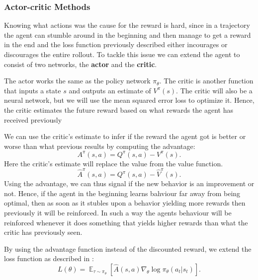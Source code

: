 \documentclass[12pt,A4]{report}
\theoremstyle{definition}
\begin{document}

\subsubsection{Actor-critic Methods}
Knowing what actions was the cause for the reward is hard, since in a trajectory the agent can stumble around in the beginning and then manage to get a reward in the end and the loss function previously described either incourages or discourages the entire rollout. To tackle this issue we can extend the agent to consist of two networks, the \textbf{actor} and the \textbf{critic}. 

The actor works the same as the policy network $\pi_\theta$. The critic is another function that inputs a state $s$ and outputs an estimate of $V^\pi(s)$. The critic will also be a neural network, but we will use the mean squared error loss to optimize it. Hence, the critic estimates the future reward based on what rewards the agent has received previously


We can use the critic's estimate to infer if the reward the agent got is better or worse than what previous results by computing the advantage:
\[A^\pi(s,a) = Q^\pi(s, a) - V^\pi(s).\]
Here the critic's estimate will replace the value from the value function.
\[\hat{A}^\pi(s,a) = Q^\pi(s, a) - \hat{V}^\pi(s).\]
Using the advantage, we can thus signal if the new behavior is an improvement or not. Hence, if the agent in the beginning learns bahviour far away from being optimal, then as soon as it stubles upon a behavior yielding more rewards then previously it will be reinforced. In such a way the agents behaviour will be reinforced whenever it does something that yields higher rewards than what the critic has previously seen. 

By using the advantage function instead of the discounted reward, we extend the loss function as described in \citet{OpenAI}:
\[ L(\theta) = \mathop{\mathbb{E}}_{\tau \sim \pi_\theta} [\hat{A}(s,a) \nabla_\theta \log \pi_\theta (a_t|s_t) ]. \]
\end{document}
